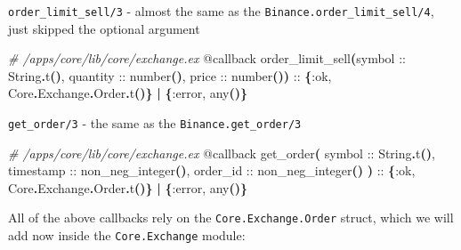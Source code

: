 \documentclass[
  oneside]{book}
\newenvironment{Shaded}{\begin{snugshade}}{\end{snugshade}}
\newcommand{\CommentTok}[1]{\textcolor[rgb]{0.56,0.35,0.01}{\textit{#1}}}
\newcommand{\ConstantTok}[1]{\textcolor[rgb]{0.56,0.35,0.01}{#1}}
\newcommand{\FunctionTok}[1]{\textcolor[rgb]{0.13,0.29,0.53}{\textbf{#1}}}
\newcommand{\NormalTok}[1]{#1}
\newcommand{\OperatorTok}[1]{\textcolor[rgb]{0.81,0.36,0.00}{\textbf{#1}}}
\newcommand{\OtherTok}[1]{\textcolor[rgb]{0.56,0.35,0.01}{#1}}
\newcommand{\VariableTok}[1]{\textcolor[rgb]{0.00,0.00,0.00}{#1}}
\begin{document}
\texttt{order\_limit\_sell/3} - almost the same as the \texttt{Binance.order\_limit\_sell/4}, just skipped the optional argument

\begin{Shaded}
\begin{Highlighting}[]
  \CommentTok{\# /apps/core/lib/core/exchange.ex}
  \OtherTok{@callback}\NormalTok{ order\_limit\_sell}\FunctionTok{(}\NormalTok{symbol :: }\ConstantTok{String}\OperatorTok{.}\NormalTok{t}\FunctionTok{()}\NormalTok{, quantity :: number}\FunctionTok{()}\NormalTok{, price :: number}\FunctionTok{())}\NormalTok{ ::}
              \FunctionTok{\{}\VariableTok{:ok}\NormalTok{, }\ConstantTok{Core}\OperatorTok{.}\ConstantTok{Exchange}\OperatorTok{.}\ConstantTok{Order}\OperatorTok{.}\NormalTok{t}\FunctionTok{()\}}
              \OperatorTok{|} \FunctionTok{\{}\VariableTok{:error}\NormalTok{, any}\FunctionTok{()\}}
\end{Highlighting}
\end{Shaded}

\texttt{get\_order/3} - the same as the \texttt{Binance.get\_order/3}

\begin{Shaded}
\begin{Highlighting}[]
  \CommentTok{\# /apps/core/lib/core/exchange.ex}
  \OtherTok{@callback}\NormalTok{ get\_order}\FunctionTok{(}
\NormalTok{              symbol :: }\ConstantTok{String}\OperatorTok{.}\NormalTok{t}\FunctionTok{()}\NormalTok{,}
\NormalTok{              timestamp :: non\_neg\_integer}\FunctionTok{()}\NormalTok{,}
\NormalTok{              order\_id :: non\_neg\_integer}\FunctionTok{()}
            \FunctionTok{)}\NormalTok{ ::}
              \FunctionTok{\{}\VariableTok{:ok}\NormalTok{, }\ConstantTok{Core}\OperatorTok{.}\ConstantTok{Exchange}\OperatorTok{.}\ConstantTok{Order}\OperatorTok{.}\NormalTok{t}\FunctionTok{()\}}
              \OperatorTok{|} \FunctionTok{\{}\VariableTok{:error}\NormalTok{, any}\FunctionTok{()\}}
\end{Highlighting}
\end{Shaded}

All of the above callbacks rely on the \texttt{Core.Exchange.Order} struct, which we will add now inside the \texttt{Core.Exchange} module:
\end{document}
